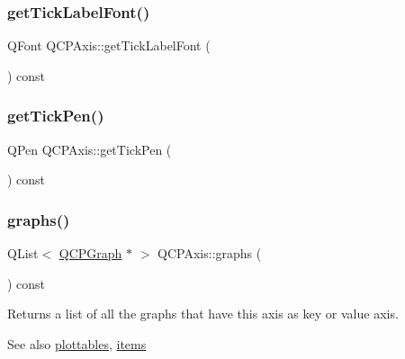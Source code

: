 \subsubsection{\texorpdfstring{get\+Tick\+Label\+Font()}{getTickLabelFont()}}
{\footnotesize\ttfamily Q\+Font Q\+C\+P\+Axis\+::get\+Tick\+Label\+Font (\begin{DoxyParamCaption}{ }\end{DoxyParamCaption}) const\hspace{0.3cm}{\ttfamily [protected]}}

\mbox{\label{class_q_c_p_axis_afe7d57415cbbf31e5549a5cc40b6f8d8}} 
\subsubsection{\texorpdfstring{get\+Tick\+Pen()}{getTickPen()}}
{\footnotesize\ttfamily Q\+Pen Q\+C\+P\+Axis\+::get\+Tick\+Pen (\begin{DoxyParamCaption}{ }\end{DoxyParamCaption}) const\hspace{0.3cm}{\ttfamily [protected]}}

\mbox{\label{class_q_c_p_axis_ad590c0da223697a2727f97a520870fec}} 
\subsubsection{\texorpdfstring{graphs()}{graphs()}}
{\footnotesize\ttfamily Q\+List$<$ \hyperlink{class_q_c_p_graph}{Q\+C\+P\+Graph} $\ast$ $>$ Q\+C\+P\+Axis\+::graphs (\begin{DoxyParamCaption}{ }\end{DoxyParamCaption}) const}

Returns a list of all the graphs that have this axis as key or value axis.

\begin{DoxySeeAlso}{See also}
\hyperlink{class_q_c_p_axis_ac5e0f6f65c75efb5fd32275d6e4ef0d6}{plottables}, \hyperlink{class_q_c_p_axis_a42761bc68e2f3a9f68549d45b73f705b}{items} 
\end{DoxySeeAlso}
\mbox{\label{class_q_c_p_axis_a63f1dd2df663680d2a8d06c19592dd63}} 
